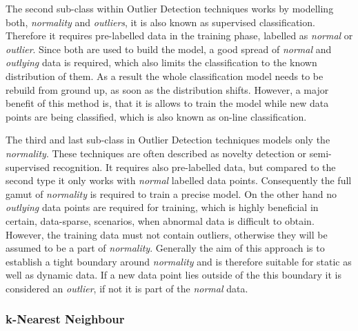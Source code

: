 The second sub-class within Outlier Detection techniques works by modelling both, \emph{normality} and \emph{outliers}, it is also known as supervised classification.
Therefore it requires pre-labelled data in the training phase, labelled as \emph{normal} or \emph{outlier}. Since both are used to build the model, a good spread of \emph{normal} and \emph{outlying} data is required, which also limits the classification to the known distribution of them.
As a result the whole classification model needs to be rebuild from ground up, as soon as the distribution shifts.
However, a major benefit of this method is, that it is allows to train the model while new data points are being classified, which is also known as on-line classification. \parencite{Hodge2004}

The third and last sub-class in Outlier Detection techniques models only the \emph{normality}. These techniques are often described as novelty detection or semi-supervised recognition.
It requires also pre-labelled data, but compared to the second type it only works with \emph{normal} labelled data points. Consequently the full gamut of \emph{normality} is required to train a precise model. On the other hand no \emph{outlying} data points are required for training, which is highly beneficial in certain, data-sparse, scenarios, when abnormal data is difficult to obtain.
However, the training data must not contain outliers, otherwise they will be assumed to be a part of \emph{normality}.
Generally the aim of this approach is to establish a tight boundary around \emph{normality} and is therefore suitable for static as well as dynamic data.
If a new data point lies outside of the this boundary it is considered an \emph{outlier}, if not it is part of the \emph{normal} data.

\newpage
\subsubsection{k-Nearest Neighbour}
\label{sec:background:network:novelty:knn}

